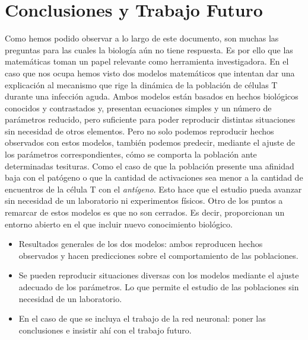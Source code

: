 \chapter{Conclusiones y Trabajo Futuro}
\label{cap:conclusiones}



Como hemos podido observar a lo largo de este documento, son muchas las preguntas para las cuales la biología aún no tiene respuesta. Es por ello que las matemáticas toman un papel relevante como herramienta investigadora. En el caso que nos ocupa hemos visto dos modelos matemáticos que intentan dar una explicación al mecanismo que rige la dinámica de la población de células T durante una infección aguda. Ambos modelos están basados en hechos biológicos conocidos y contrastados y, presentan ecuaciones simples y un número de parámetros reducido, pero suficiente para poder reproducir distintas situaciones sin necesidad de otros elementos. Pero no solo podemos reproducir hechos observados con estos modelos, también podemos predecir, mediante el ajuste de los parámetros correspondientes, cómo se comporta la población ante determinadas tesituras. Como el caso de que la población presente una afinidad baja con el patógeno o que la cantidad de activaciones sea menor a la cantidad de encuentros de la célula T con el \textit{antígeno}. Esto hace que el estudio pueda avanzar sin necesidad de un laboratorio ni experimentos físicos. Otro de los puntos a remarcar de estos modelos es que no son cerrados. Es decir, proporcionan un entorno abierto en el que incluir nuevo conocimiento biológico.



\begin{itemize}
	\item Resultados generales de los dos modelos: ambos reproducen hechos observados y hacen predicciones sobre el comportamiento de las poblaciones.
	
	\item Se pueden reproducir situaciones diversas con los modelos mediante el ajuste adecuado de los parámetros. Lo que permite el estudio de las poblaciones sin necesidad de un laboratorio.
	
	\item En el caso de que se incluya el trabajo de la red neuronal: poner las conclusiones e insistir ahí con el trabajo futuro.
\end{itemize}

